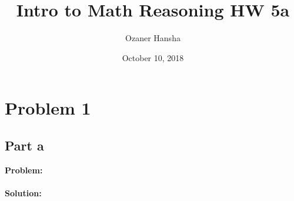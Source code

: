 \documentclass{article}
\begin{document}
\title{Intro to Math Reasoning HW 5a}
\author{Ozaner Hansha}
\date{October 10, 2018}
\maketitle

\section*{Problem 1}
\subsection*{Part a}
\textbf{Problem:}
\\\\
\textbf{Solution:}
\end{document}
